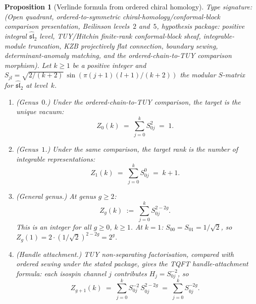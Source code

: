 \documentclass[11pt,reqno]{amsart}
\newtheorem{proposition}[theorem]{Proposition}
\theoremstyle{definition}
\theoremstyle{remark}
\numberwithin{equation}{section}
\begin{document}
\begin{proposition}[Verlinde formula from ordered chiral homology]
\label{prop:verlinde-standalone}
\ClaimStatusConditional
Type signature: \textup{(}Open quadrant, ordered-to-symmetric
chiral-homology/conformal-block comparison presentation, Beilinson
levels~$2$ and~$5$, hypothesis package: positive integral
\(\widehat{\mathfrak{sl}}_2\) level, TUY/Hitchin finite-rank
conformal-block sheaf, integrable-module truncation, KZB
projectively flat connection, boundary sewing, determinant-anomaly
matching, and the ordered-chain-to-TUY comparison morphism\textup{)}.
Let $k \geq 1$ be a positive integer and
$S_{jl} = \sqrt{2/(k+2)}\,\sin(\pi(j+1)(l+1)/(k+2))$
the modular $S$-matrix for $\widehat{\mathfrak{sl}}_2$ at
level~$k$.
\begin{enumerate}[label=\textup{(\roman*)}]
\item \textup{(Genus~$0$.)} Under the ordered-chain-to-TUY
  comparison, the target is the unique vacuum:
  \begin{equation}\label{eq:verlinde-g0-standalone}
    Z_0(k)
    \;=\;
    \sum_{j=0}^{k} S_{0j}^2 \;=\; 1.
  \end{equation}

\item \textup{(Genus~$1$.)} Under the same comparison, the target
  rank is the number of integrable representations:
  \begin{equation}\label{eq:verlinde-g1-standalone}
    Z_1(k) \;=\; \sum_{j=0}^{k} S_{0j}^0 \;=\; k+1.
  \end{equation}

\item \textup{(General genus.)} At genus $g \geq 2$:
  \begin{equation}\label{eq:verlinde-general-standalone}
    Z_g(k)
    \;:=\;
    \sum_{j=0}^{k} S_{0j}^{2-2g}.
  \end{equation}
  This is an integer for all $g \geq 0$, $k \geq 1$.
  At $k = 1$: $S_{00} = S_{01} = 1/\sqrt{2}$, so
  $Z_g(1) = 2 \cdot (1/\sqrt{2})^{2-2g} = 2^g$.

\item \textup{(Handle attachment.)}
  TUY non-separating factorisation, compared with ordered sewing
  under the stated package, gives the TQFT handle-attachment formula:
  each
  isospin channel $j$ contributes $H_j = S_{0j}^{-2}$, so
  \begin{equation}\label{eq:handle-standalone}
    Z_{g+1}(k)
    \;=\;
    \sum_{j=0}^{k} S_{0j}^{-2}\, S_{0j}^{2-2g}
    \;=\;
    \sum_{j=0}^{k} S_{0j}^{-2g}.
  \end{equation}
\end{enumerate}
\end{proposition}
\end{document}
